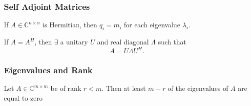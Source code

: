 \documentclass{beamer}
\begin{document}
\begin{frame}\frametitle{Self Adjoint Matrices}

	\begin{theorem}
		If $A\in\mathbb{C}^{n\times n}$ is Hermitian,
		then $q_i = m_i$ for each eigenvalue $\lambda_i$.
	\end{theorem}
	
	\begin{corollary}
		If $A=A^H$, then $\exists$ a unitary $U$ and real diagonal $\Lambda$ such that
		\[
			A = U \Lambda U^H.
		\]
	\end{corollary}
	
\end{frame}

\begin{frame}\frametitle{Eigenvalues and Rank}
	
	\begin{lemma}
		Let $A \in \mathbb{C}^{m\times m}$ be of rank $r < m$.  Then at least $m- r$ of the eigenvalues of $A$ are equal to zero	
	\end{lemma}
\end{frame}
\end{document}

